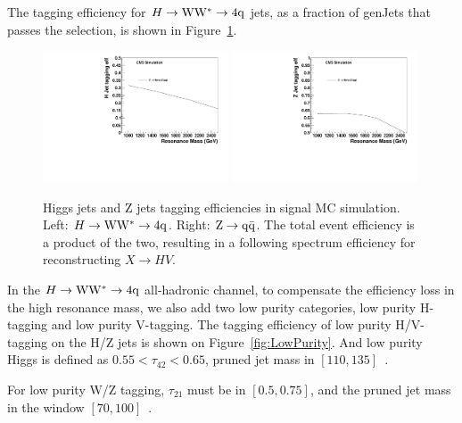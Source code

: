 The tagging efficiency for $H\to{\rm W}{\rm W}^*\to4{\rm q}$ jets, as a fraction of genJets that
passes the selection, is shown in Figure~\ref{fig:HwwEff}.
\begin{figure}[htb]
\begin{center}
\includegraphics[width=0.49\textwidth]{EXO-14-009/HqqqqZqqfigs/Signal/H-taggingEff-8TeV.pdf}
\includegraphics[width=0.49\textwidth]{EXO-14-009/HqqqqZqqfigs/Signal/Z-taggingEff-8TeV.pdf}
\end{center}
\caption{
  Higgs jets and Z jets tagging efficiencies in signal MC simulation.
  Left: $H\to{\rm W}{\rm W}^*\to4{\rm q}$. Right: ${\rm Z}\to{\rm q\bar{q}}$.  The total event efficiency is a product
  of the two, resulting in a following spectrum efficiency for reconstructing
  $X \to HV$.
}
\label{fig:HwwEff}
\end{figure}
 

In the $H\to{\rm W}{\rm W}^*\to4{\rm q}$ all-hadronic channel, to compensate the efficiency loss
in the high resonance mass, we also add two low purity categories, low
purity H-tagging and low purity V-tagging.  The tagging efficiency of
low purity H/V-tagging on the H/Z jets is shown on
Figure~\ref{fig:LowPurity}.  And low purity Higgs is defined as 
$0.55 < \tau_{42} < 0.65$, pruned jet mass in $[110, 135]$~\GeVcc.  

For low purity W/Z tagging, $\tau_{21}$ must be in $[0.5, 0.75]$, 
and the pruned jet mass in the window $[70, 100]$~\GeVcc.


